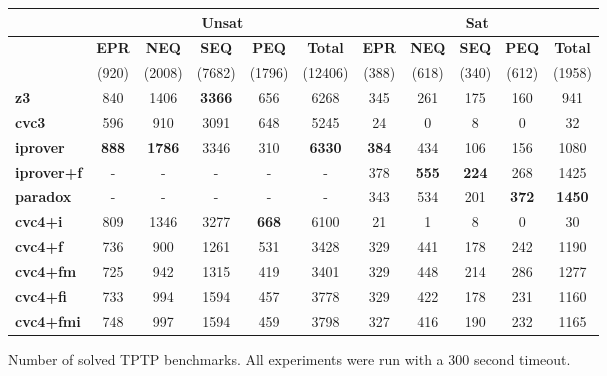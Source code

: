 \documentclass{svjour3}                     %
\begin{document}
\begin{figure}[t]
\tiny
\centering
\begin{tabular}{|l|c|c|c|c|c|c|c|c|c|c|}
\hline
 & \multicolumn{5}{c|}{Unsat} & \multicolumn{5}{c|}{Sat}
\\
\hline
 & {\bf EPR} & {\bf NEQ} & {\bf SEQ} & {\bf PEQ} & {\bf Total} & {\bf EPR} & {\bf NEQ} & {\bf SEQ} & {\bf PEQ} & {\bf Total}
\\
 & (920) & (2008) & (7682) & (1796) & (12406) & (388) & (618) & (340) & (612) & (1958)
\\
\hline
{\bf z3 } &  840 & 1406 & {\bf 3366} & 656 & 6268 & 345 & 261 & 175 & 160 & 941
\\
{\bf cvc3 } &  596 & 910 & 3091 & 648 & 5245 & 24 & 0 & 8 & 0 & 32
\\
{\bf iprover } &  {\bf 888} & {\bf 1786} & 3346 & 310 & {\bf 6330} & {\bf 384} & 434 & 106 & 156 & 1080
\\
{\bf iprover+f } &  - & - & - & - & - & 378 & {\bf 555} & {\bf 224} & 268 & 1425
\\
{\bf paradox } &  - & - & - & - & - & 343 & 534 & 201 & {\bf 372} & {\bf 1450}
\\
{\bf cvc4+i } &  809 & 1346 & 3277 & {\bf 668} & 6100 & 21 & 1 & 8 & 0 & 30
\\
{\bf cvc4+f } &  736 & 900 & 1261 & 531 & 3428 & 329 & 441 & 178 & 242 & 1190
\\
{\bf cvc4+fm } &  725 & 942 & 1315 & 419 & 3401 & 329 & 448 & 214 & 286 & 1277
\\
{\bf cvc4+fi } &  733 & 994 & 1594 & 457 & 3778 & 329 & 422 & 178 & 231 & 1160
\\
{\bf cvc4+fmi } &  748 & 997 & 1594 & 459 & 3798 & 327 & 416 & 190 & 232 & 1165
\\
\hline
\end{tabular}
\caption{Number of solved TPTP benchmarks.  All experiments were run with a 300 second timeout.}
\label{fig:tptp-results}
\end{figure}
\end{document}

